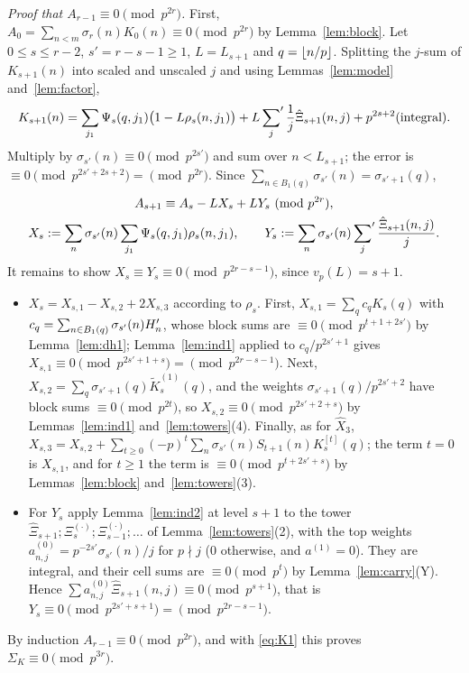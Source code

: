\documentclass[11pt]{amsart}
\begin{document}
\emph{Proof that $A_{r-1}\equiv0\pmod{p^{2r}}$.} First, $A_0=\sum_{n<m}\sigma_r(n)K_0(n)\equiv0\pmod{p^{2r}}$ by Lemma~\ref{lem:block}. Let $0\le s\le r-2$, $s'=r-s-1\ge1$, $L=L_{s+1}$ and $q=\left\lfloor n/p\right\rfloor$. Splitting the $j$-sum of $K_{s+1}(n)$ into scaled and unscaled $j$ and using Lemmas~\ref{lem:model} and~\ref{lem:factor},
\[ K_{s+1}(n)=\sum_{j_1}\Psi_s(q,j_1)\bigl(1-L\rho_s(n,j_1)\bigr)+L\sideset{}{'}\sum_j\frac1j\hat\Xi_{s+1}(n,j)+p^{2s+2}(\text{integral}). \]
Multiply by $\sigma_{s'}(n)\equiv0\pmod{p^{2s'}}$ and sum over $n<L_{s+1}$; the error is $\equiv0\pmod{p^{2s'+2s+2}}=\pmod{p^{2r}}$. Since $\sum_{n\in B_1(q)}\sigma_{s'}(n)=\sigma_{s'+1}(q)$,
\begin{gather*} A_{s+1}\equiv A_s-LX_s+LY_s\ (\mathrm{mod}\ p^{2r}),\\ X_s:=\sum_n\sigma_{s'}(n)\sum_{j_1}\Psi_s(q,j_1)\rho_s(n,j_1),\qquad Y_s:=\sum_n\sigma_{s'}(n)\sideset{}{'}\sum_j\frac{\hat\Xi_{s+1}(n,j)}j. \end{gather*}
It remains to show $X_s\equiv Y_s\equiv0\pmod{p^{2r-s-1}}$, since $v_p(L)=s+1$.
\begin{itemize}
\item $X_s=X_{s,1}-X_{s,2}+2X_{s,3}$ according to $\rho_s$. First, $X_{s,1}=\sum_qc_qK_s(q)$ with $c_q=\sum_{n\in B_1(q)}\sigma_{s'}(n)H'_n$, whose block sums are $\equiv0\pmod{p^{t+1+2s'}}$ by Lemma~\ref{lem:dh1}; Lemma~\ref{lem:ind1} applied to $c_q/p^{2s'+1}$ gives $X_{s,1}\equiv0\pmod{p^{2s'+1+s}}=\pmod{p^{2r-s-1}}$. Next, $X_{s,2}=\sum_q\sigma_{s'+1}(q)\tilde K^{(1)}_s(q)$, and the weights $\sigma_{s'+1}(q)/p^{2s'+2}$ have block sums $\equiv0\pmod{p^{2t}}$, so $X_{s,2}\equiv0\pmod{p^{2s'+2+s}}$ by Lemmas~\ref{lem:ind1} and~\ref{lem:towers}(4). Finally, as for $\hat X_3$, $X_{s,3}=X_{s,2}+\sum_{t\ge0}(-p)^t\sum_n\sigma_{s'}(n)S_{t+1}(n)K^{[t]}_s(q)$; the term $t=0$ is $X_{s,1}$, and for $t\ge1$ the term is $\equiv0\pmod{p^{t+2s'+s}}$ by Lemmas~\ref{lem:block} and~\ref{lem:towers}(3).
\item For $Y_s$ apply Lemma~\ref{lem:ind2} at level $s+1$ to the tower $\hat\Xi_{s+1};\Xi^{(\cdot)}_s;\Xi^{(\cdot)}_{s-1};\dots$ of Lemma~\ref{lem:towers}(2), with the top weights $a^{(0)}_{n,j}=p^{-2s'}\sigma_{s'}(n)/j$ for $p\nmid j$ ($0$ otherwise, and $a^{(1)}=0$). They are integral, and their cell sums are $\equiv0\pmod{p^t}$ by Lemma~\ref{lem:carry}(Y). Hence $\sum a^{(0)}_{n,j}\hat\Xi_{s+1}(n,j)\equiv0\pmod{p^{s+1}}$, that is $Y_s\equiv0\pmod{p^{2s'+s+1}}=\pmod{p^{2r-s-1}}$.
\end{itemize}
By induction $A_{r-1}\equiv0\pmod{p^{2r}}$, and with \eqref{eq:K1} this proves $\Sigma_K\equiv0\pmod{p^{3r}}$.
\end{document}
